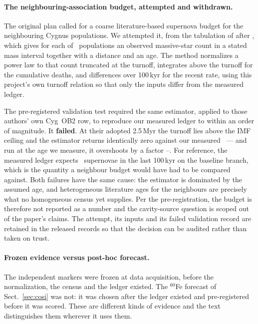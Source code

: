 \documentclass{aa}
\begin{document}
\paragraph{The neighbouring-association budget, attempted and withdrawn.}
The original plan called for a coarse literature-based supernova budget for the
neighbouring Cygnus populations. We attempted it, from the tabulation of
\citet{martin2010} after \citet{knodlseder2002}, which gives for each of
\neighbourPopulations\ populations an observed massive-star count in a stated
mass interval together with a distance and an age. The method normalizes a power
law to that count truncated at the turnoff, integrates above the turnoff for the
cumulative deaths, and differences over 100\,kyr for the recent rate, using this
project's own turnoff relation so that only the inputs differ from the measured
ledger.

The pre-registered validation test required the same estimator, applied to those authors'
own Cyg~OB2 row, to reproduce our measured ledger to within an order of
magnitude. It \textbf{failed}. At their adopted 2.5\,Myr the turnoff lies above
the IMF ceiling and the estimator returns identically zero against our measured
\NSN\ --- and run at the age we measure, it overshoots by a factor
\coarseRatioLo--\coarseRatioHi. For reference, the measured ledger expects
\coarseRecent\ supernovae in the last 100\,kyr on the baseline branch, which is
the quantity a neighbour budget would have had to be compared against. Both
failures have the same cause: the estimator
is dominated by the assumed age, and heterogeneous literature ages for the
neighbours are precisely what no homogeneous census yet supplies. Per the
pre-registration, the budget is therefore not reported as a number and the
cavity-source question is scoped out of the paper's claims. The attempt, its
inputs and its failed validation record are retained in the released records so that the
decision can be audited rather than taken on trust.

\paragraph{Frozen evidence versus post-hoc forecast.}
The independent markers were frozen at data acquisition, before the normalization, the
census and the ledger existed. The $^{60}$Fe forecast of Sect.~\ref{sec:cosi}
was not: it was chosen after the ledger existed and pre-registered before it was
scored. These are different kinds of evidence and the text distinguishes them
wherever it uses them.
\end{document}
